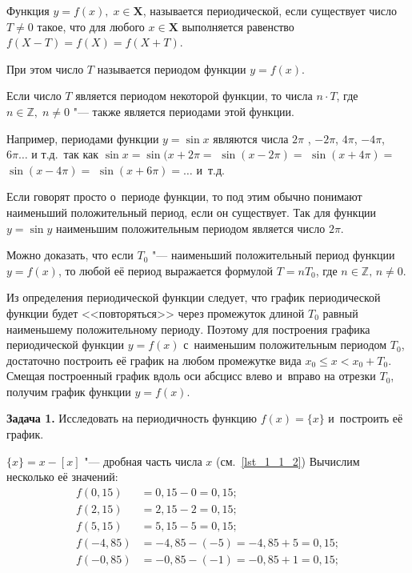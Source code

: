 \begin{Def}
Функция $y = f(x), \; x \in \mathbf{X}$, называется периодической, если
существует число $T \ne 0$ такое, что для любого $x \in \mathbf{X}$
выполняется равенство 
$f(X - T) = f(X) = f(X + T)$.
\end{Def}

При этом число $T$ называется периодом функции $y = f(x)$.

Если число $T$ является периодом некоторой функции, то числа $n \cdot T$,
где $n \in \mathbb{Z}, \; n \ne 0$ "--- также является периодами этой функции.

Например, периодами функции $y = \sin x$ являются числа $2\pi$ , $-2\pi$,
$4\pi$, $-4\pi$, $6\pi \dots$ и т.д.\ так как
$\sin x = \sin (x + 2\pi =$ $\sin (x -2\pi)=$ $\sin (x + 4\pi)=$
$\sin (x - 4\pi)=$ $\sin (x + 6\pi)= \dots$ и~т.д.

Если говорят просто о~периоде функции, то под этим обычно понимают
наименьший положительный период, если он существует.
Так для функции $y = \sin y$ наименьшим положительным периодом является
число $2\pi$.

Можно доказать, что если $T_{0}$ "--- наименьший положительный период
функции $y = f(x)$, то любой её период выражается формулой
$T = nT_{0}$, где $n \in \mathbb{Z}, \, n \ne 0$.

Из определения периодической функции следует, что график периодической функции
будет <<повторяться>> через промежуток длиной $T_{0}$ равный наименьшему
положительному периоду. Поэтому для построения графика периодической функции
$y = f(x)$ с~наименьшим положительным периодом $T_{0}$, достаточно построить
её график на любом промежутке вида $x_{0} \leqslant x < x_{0} + T_{0}$.
Смещая построенный график вдоль оси абсцисс влево и~вправо на отрезки $T_{0}$,
получим график функции $y = f(x)$.

\textbf{Задача 1.} Исследовать на периодичность функцию $f(x) = \{x\}$
и~построить её график.

$\{x\} = x - [x]$ "--- дробная часть числа $x$ (см.\ \ref{lst_1_1_2})
Вычислим несколько её значений:
\begin{align*}
f(0{,}15) &= 0{,}15 - 0 = 0{,}15; \\
f(2{,}15) &= 2{,}15 - 2 = 0{,}15; \\
f(5{,}15) &= 5{,}15 - 5 = 0{,}15; \\
f(-4{,}85) &= -4{,}85 - (-5) = -4{,}85 + 5 = 0{,}15; \\
f(-0{,}85) &= -0{,}85 - (-1) = -0{,}85 + 1 = 0{,}15; \\
\end{align*}

